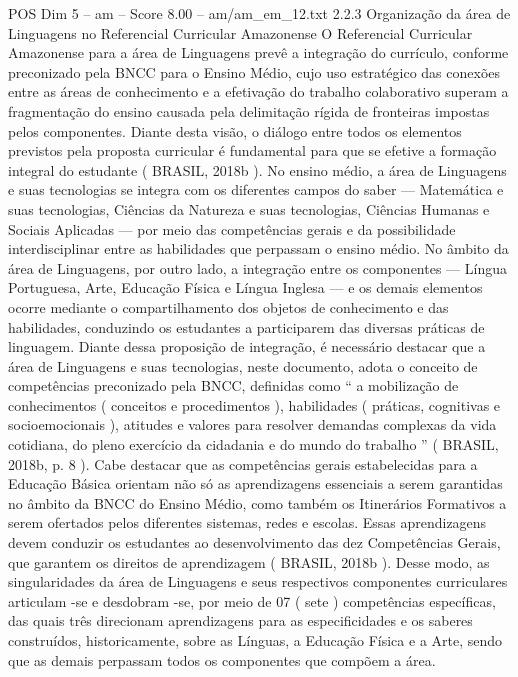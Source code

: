 \begin{textsample}{POS Dim 5 – am – Score 8.00 – am/am\_em\_12.txt}  \label{ex:f5_pos_067}
2.2.3 Organização da área de Linguagens no Referencial Curricular Amazonense O Referencial Curricular Amazonense para a área de Linguagens prevê a integração do currículo, conforme preconizado pela BNCC para o Ensino Médio, cujo uso estratégico das conexões entre as áreas de conhecimento e a efetivação do trabalho colaborativo superam a fragmentação do ensino causada pela delimitação rígida de fronteiras impostas pelos componentes.
Diante desta visão, o diálogo entre todos os elementos previstos pela proposta curricular é fundamental para que se efetive a formação integral do estudante ( BRASIL, 2018b ).
No ensino médio, a área de Linguagens e suas tecnologias se integra com os diferentes campos do saber — Matemática e suas tecnologias, Ciências da Natureza e suas tecnologias, Ciências Humanas e Sociais Aplicadas — por meio das competências gerais e da possibilidade interdisciplinar entre as habilidades que perpassam o ensino médio.
No âmbito da área de Linguagens, por outro lado, a integração entre os componentes — Língua Portuguesa, Arte, Educação Física e Língua Inglesa — e os demais elementos ocorre mediante o compartilhamento dos objetos de conhecimento e das habilidades, conduzindo os estudantes a participarem das diversas práticas de linguagem.
Diante dessa proposição de integração, é necessário destacar que a área de Linguagens e suas tecnologias, neste documento, adota o conceito de competências preconizado pela BNCC, definidas como “ a mobilização de conhecimentos ( conceitos e procedimentos ), habilidades ( práticas, cognitivas e socioemocionais ), atitudes e valores para resolver demandas complexas da vida cotidiana, do pleno exercício da cidadania e do mundo do trabalho ” ( BRASIL, 2018b, p. 8 ).
Cabe destacar que as competências gerais estabelecidas para a Educação Básica orientam não só as aprendizagens essenciais a serem garantidas no âmbito da BNCC do Ensino Médio, como também os Itinerários Formativos a serem ofertados pelos diferentes sistemas, redes e escolas.
Essas aprendizagens devem conduzir os estudantes ao desenvolvimento das dez Competências Gerais, que garantem os direitos de aprendizagem ( BRASIL, 2018b ).
Desse modo, as singularidades da área de Linguagens e seus respectivos componentes curriculares articulam -se e desdobram -se, por meio de 07 ( sete ) competências específicas, das quais três direcionam aprendizagens para as especificidades e os saberes construídos, historicamente, sobre as Línguas, a Educação Física e a Arte, sendo que as demais perpassam todos os componentes que compõem a área.

\end{textsample}
